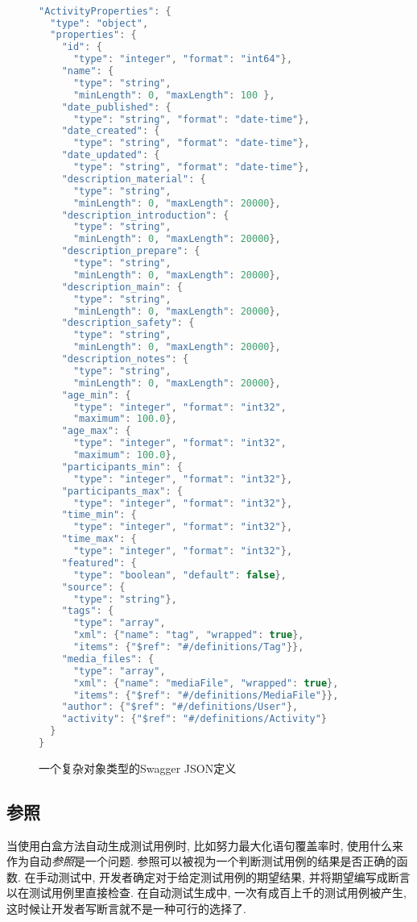     \begin{figure}
      {
        \tt
        \scriptsize
      \begin{lstlisting}[language=C++]
"ActivityProperties": { 
  "type": "object", 
  "properties": {
    "id": {
      "type": "integer", "format": "int64"},
    "name": {
      "type": "string",
      "minLength": 0, "maxLength": 100 },
    "date_published": { 
      "type": "string", "format": "date-time"},
    "date_created": { 
      "type": "string", "format": "date-time"},
    "date_updated": { 
      "type": "string", "format": "date-time"},
    "description_material": {
      "type": "string",
      "minLength": 0, "maxLength": 20000},
    "description_introduction": {
      "type": "string",
      "minLength": 0, "maxLength": 20000},
    "description_prepare": {
      "type": "string",
      "minLength": 0, "maxLength": 20000},
    "description_main": {
      "type": "string",
      "minLength": 0, "maxLength": 20000},
    "description_safety": {
      "type": "string",
      "minLength": 0, "maxLength": 20000},
    "description_notes": {
      "type": "string",
      "minLength": 0, "maxLength": 20000},
    "age_min": {
      "type": "integer", "format": "int32",
      "maximum": 100.0},
    "age_max": {
      "type": "integer", "format": "int32",
      "maximum": 100.0},
    "participants_min": {
      "type": "integer", "format": "int32"},
    "participants_max": { 
      "type": "integer", "format": "int32"},
    "time_min": { 
      "type": "integer", "format": "int32"},
    "time_max": { 
      "type": "integer", "format": "int32"},
    "featured": { 
      "type": "boolean", "default": false},
    "source": {
      "type": "string"},
    "tags": {
      "type": "array",
      "xml": {"name": "tag", "wrapped": true}, 
      "items": {"$ref": "#/definitions/Tag"}},
    "media_files": {
      "type": "array",
      "xml": {"name": "mediaFile", "wrapped": true}, 
      "items": {"$ref": "#/definitions/MediaFile"}},
    "author": {"$ref": "#/definitions/User"}, 
    "activity": {"$ref": "#/definitions/Activity"}
  }
}
        \end{lstlisting}
        }
        \caption{一个复杂对象类型的Swagger JSON定义}
        \label{fig2}
    \end{figure}
    
    \subsection{参照}
    当使用白盒方法自动生成测试用例时, 比如努力最大化语句覆盖率时, 使用什么来作为自动\textit{参照}是一个问题\cite{barr2015oracle}. 参照可以被视为一个判断测试用例的结果是否正确的函数. 在手动测试中, 开发者确定对于给定测试用例的期望结果, 并将期望编写成断言以在测试用例里直接检查. 在自动测试生成中, 一次有成百上千的测试用例被产生, 这时候让开发者写断言就不是一种可行的选择了. 
        
